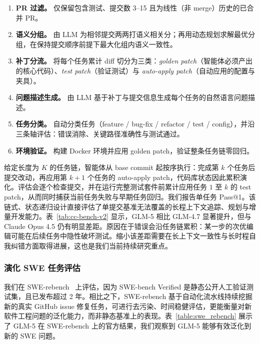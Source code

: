 \begin{enumerate}[leftmargin=1.5em,itemsep=2pt]
    \item \textbf{PR 过滤。} 仅保留包含测试、提交数 3--15 且为线性（非 merge）历史的已合并 PR。
    \item \textbf{语义分组。} 由 LLM 为相邻提交两两打语义相关分；再用动态规划求解最优分组，在保持提交顺序前提下最大化组内语义一致性。
    \item \textbf{补丁分流。} 将每个任务累计 diff 切分为三类：\emph{golden patch}（智能体必须产出的核心代码）、\emph{test patch}（验证测试）与 \emph{auto-apply patch}（自动应用的配置与夹具）。
    \item \textbf{问题描述生成。} 由 LLM 基于补丁与提交信息生成每个任务的自然语言问题描述。
    \item \textbf{任务分类。} 自动分类任务（feature / bug-fix / refactor / test / config），并沿三条轴评估：错误消除、关键路径准确性与测试通过。
    \item \textbf{环境验证。} 构建 Docker 环境并应用 golden patch，验证整条任务链零回归。
\end{enumerate}

给定长度为 $K$ 的任务链，智能体从 base commit 起按序执行：完成第 $k$ 个任务后提交改动，再应用第 $k{+}1$ 个任务的 auto-apply patch，代码库状态因此累积演化。评估会逐个检查提交，并在运行完整测试套件前累计应用任务 $1$ 至 $k$ 的 test patch，从而同时捕获当前任务失败与早期任务回归。我们报告单任务 Pass@1。该链式、状态递归设计直接评估了单提交基准无法覆盖的长程上下文追踪、规划与增量开发能力。表~\ref{tab:cc-bench-v2} 显示，GLM-5 相比 GLM-4.7 显著提升，但与 Claude Opus 4.5 仍有明显差距。原因在于错误会沿任务链累积：某一步的次优编辑可能在后续任务中隐性破坏测试。缩小该差距需要在长上下文一致性与长时程自我纠错方面取得进展，这也是我们当前持续研究重点。


\subsubsection{演化 SWE 任务评估}
我们在 SWE-rebench~\cite{badertdinov2025swe} 上评估，因为 SWE-bench Verified 是静态公开人工验证测试集，且已发布超过 2 年。相比之下，SWE-rebench 基于自动化流水线持续挖掘新的真实 GitHub issue 修复任务，可进行去污染、时间稳健评估，更能衡量对新软件工程问题的泛化能力，而非静态基准上的表现。表~\ref{table:swe_rebench} 展示了 GLM-5 在 SWE-rebench 上的官方结果，我们观察到 GLM-5 能够有效泛化到新的 SWE 问题。


